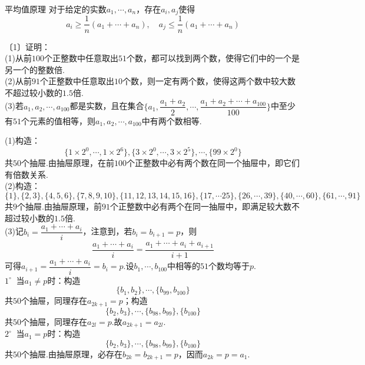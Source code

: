 \documentclass[cn,hazy,black,10pt,normal]{elegantnote}
\newcommand{\nd}[1]{〔#1〕}
\newcommand{\buzhou}[1]{$#1^{\circ} \ $}
\begin{document}
\begin{corollary}{平均值原理}
	对于给定的实数$a_1, \cdots ,a_n$，存在$a_i,a_j$使得$$a_i \geq \dfrac{1}{n}(a_1+ \cdots +a_n), \quad a_j \leq \dfrac{1}{n}(a_1+ \cdots +a_n)$$
\end{corollary}

\begin{problem} %
	\nd{1}证明： \\
	(1)从前$100$个正整数中任意取出$51$个数，都可以找到两个数，使得它们中的一个是另一个的整数倍. \\
	(2)从前$91$个正整数中任意取出$10$个数，则一定有两个数，使得这两个数中较大数不超过较小数的$1.5$倍. \\
	(3)若$a_1,a_2,\cdots ,a_{100}$都是实数，且在集合$\{ a_1, \dfrac{a_1+a_2}{2}, \cdots ,\dfrac{a_1+a_2+\cdots +a_{100}}{100} \}$中至少有$51$个元素的值相等，则$a_1,a_2, \cdots ,a_{100}$中有两个数相等.
\end{problem}
\begin{solution}
	(1)构造：$$\{ 1 \times 2^0, \cdots , 1 \times 2^6 \},\{ 3 \times 2^0, \cdots , 3 \times 2^5 \}, \cdots ,\{99 \times 2^0 \}$$共$50$个抽屉.由抽屉原理，在前$100$个正整数中必有两个数在同一个抽屉中，即它们有倍数关系. \\
	(2)构造：$$\{ 1 \},\{ 2,3 \},\{ 4,5,6 \},\{ 7,8,9,10 \},\{ 11,12,13,14,15,16 \},\{ 17,\cdots 25 \},\{ 26,\cdots ,39 \},\{ 40, \cdots ,60 \},\{ 61, \cdots ,91 \}$$共$9$个抽屉.由抽屉原理，前$91$个正整数中必有两个在同一抽屉中，即满足较大数不超过较小数的$1.5$倍. \\
	(3)记$b_i=\dfrac{a_1+ \cdots + a_i}{i}$，注意到，若$b_i=b_{i+1}=p$，则$$\frac{a_1+ \cdots + a_i}{i} = \frac{a_1+ \cdots + a_i + a_{i+1}}{i+1}$$可得$a_{i+1} = \dfrac{a_1 + \cdots + a_i}{i} = b_i = p$.设$b_1, \cdots ,b_{100}$中相等的$51$个数均等于$p$. \\
	\buzhou{1} 当$a_1 \neq p$时：构造$$\{ b_1,b_2 \}, \cdots ,\{ b_{99},b_{100} \}$$共$50$个抽屉，同理存在$a_{2k+1}=p$；构造$$\{ b_2,b_3 \}, \cdots ,\{ b_{98},b_{99} \},\{ b_{100} \}$$共$50$个抽屉，同理存在$a_{2l}=p$.故$a_{2k+1}=a_{2l}$. \\
	\buzhou{2} 当$a_1=p$时：构造$$\{ b_2,b_3 \}, \cdots ,\{ b_{98},b_{99} \},\{ b_{100} \}$$共$50$个抽屉.由抽屉原理，必存在$b_{2k}=b_{2k+1}=p$，因而$a_{2k}=p=a_1$.
\end{solution}
\end{document}
